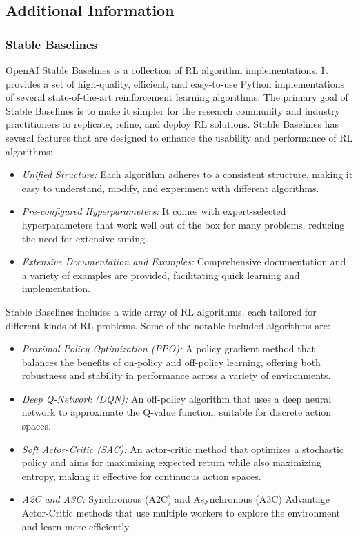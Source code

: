 \begin{withcode}

\section{Additional Information}

\subsubsection*{Stable Baselines}

OpenAI Stable Baselines is a collection of RL algorithm implementations. It provides a set of high-quality, efficient, and easy-to-use Python implementations of several state-of-the-art reinforcement learning algorithms. The primary goal of Stable Baselines is to make it simpler for the research community and industry practitioners to replicate, refine, and deploy RL solutions. Stable Baselines has several features that are designed to enhance the usability and performance of RL algorithms:

\begin{itemize}
    \item \emph{Unified Structure:} Each algorithm adheres to a consistent structure, making it easy to understand, modify, and experiment with different algorithms.
    \item \emph{Pre-configured Hyperparameters:} It comes with expert-selected hyperparameters that work well out of the box for many problems, reducing the need for extensive tuning.
    \item \emph{Extensive Documentation and Examples:} Comprehensive documentation and a variety of examples are provided, facilitating quick learning and implementation.
\end{itemize}

Stable Baselines includes a wide array of RL algorithms, each tailored for different kinds of RL problems. Some of the notable included algorithms are:

\begin{itemize}
    \item \emph{Proximal Policy Optimization (PPO):} A policy gradient method that balances the benefits of on-policy and off-policy learning, offering both robustness and stability in performance across a variety of environments.
    \item \emph{Deep Q-Network (DQN):} An off-policy algorithm that uses a deep neural network to approximate the Q-value function, suitable for discrete action spaces.
    \item \emph{Soft Actor-Critic (SAC):} An actor-critic method that optimizes a stochastic policy and aims for maximizing expected return while also maximizing entropy, making it effective for continuous action spaces.
    \item \emph{A2C and A3C:} Synchronous (A2C) and Asynchronous (A3C) Advantage Actor-Critic methods that use multiple workers to explore the environment and learn more efficiently.
\end{itemize}


\end{withcode}
